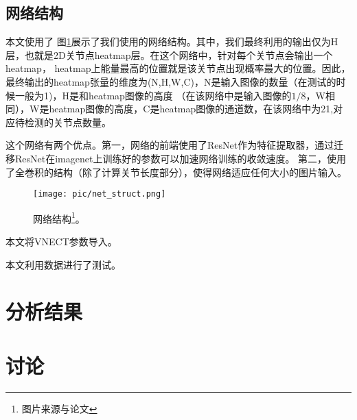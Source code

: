 \documentclass[a4paper, 10pt]{article}
\begin{document}
\subsection{网络结构}
本文使用了
图\ref{pic:net_struct}展示了我们使用的网络结构。其中，我们最终利用的输出仅为H层，也就是2D关节点heatmap层。在这个网络中，针对每个关节点会输出一个heatmap，
heatmap上能量最高的位置就是该关节点出现概率最大的位置。因此，最终输出的heatmap张量的维度为(N,H,W,C)，N是输入图像的数量（在测试的时候一般为1)，H是和heatmap图像的高度
（在该网络中是输入图像的$1/8$，W相同），W是heatmap图像的高度，C是heatmap图像的通道数，在该网络中为21,对应待检测的关节点数量。

这个网络有两个优点。第一，网络的前端使用了ResNet\cite{he2016deep}作为特征提取器，通过迁移ResNet在imagenet上训练好的参数可以加速网络训练的收敛速度。
第二，使用了全巻积的结构（除了计算关节长度部分），使得网络适应任何大小的图片输入。

\begin{figure}[ht!]
    \centering
    \texttt{[image: pic/net\_struct.png]}
    \label{pic:net_struct} 
    \caption{网络结构\footnote{图片来源与论文\cite{mehta2017vnect}}。}
\end{figure}

本文将VNECT参数导入。

本文利用数据进行了测试。

\section{分析结果}


\section{讨论}





\end{document}
